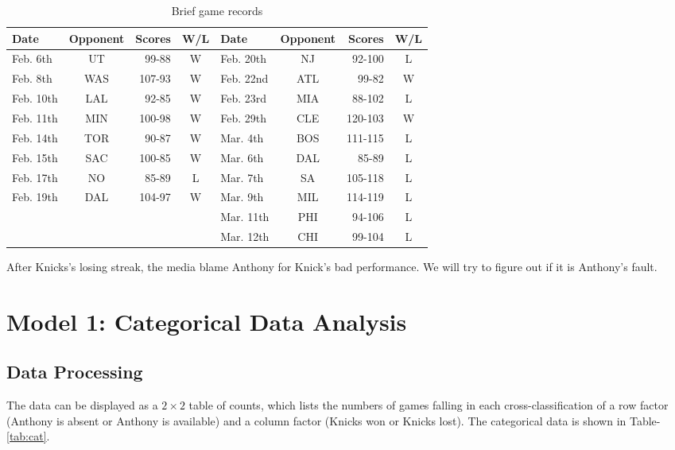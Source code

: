 \documentclass[12pt]{article}
\begin{document}
\begin{table}[ht!]
  \begin{center}
    \begin{tabular}{|l|c|r|c|l|c|r|c|}
      \hline
Date      & Opponent & Scores  & W/L &
Date      & Opponent & Scores  & W/L \\ \hline
Feb. 6th  & UT       & 99-88   & W   &
Feb. 20th & NJ       & 92-100  & L   \\ \hline
Feb. 8th  & WAS      & 107-93  & W   &
Feb. 22nd & ATL      & 99-82   & W   \\ \hline
Feb. 10th & LAL      & 92-85   & W   &
Feb. 23rd & MIA      & 88-102  & L   \\ \hline
Feb. 11th & MIN      & 100-98  & W   &
Feb. 29th & CLE      & 120-103 & W   \\ \hline
Feb. 14th & TOR      & 90-87   & W   &
Mar. 4th  & BOS      & 111-115 & L   \\ \hline
Feb. 15th & SAC      & 100-85  & W   &
Mar. 6th  & DAL      & 85-89   & L   \\ \hline
Feb. 17th & NO       & 85-89   & L   &
Mar. 7th  & SA       & 105-118 & L   \\ \hline
Feb. 19th & DAL      & 104-97  & W   &
Mar. 9th  & MIL      & 114-119 & L   \\ \hline
          &          &         &     &
Mar. 11th & PHI      & 94-106  & L   \\ \hline
          &          &         &     &
Mar. 12th & CHI      & 99-104  & L   \\ \hline
    \end{tabular}
  \end{center}
  \caption{Brief game records \label{tab:data1}}
\end{table}

After Knicks's losing streak, the media blame Anthony for Knick's bad
performance. We will try to figure out if it is Anthony's fault.

\section{Model 1: Categorical Data Analysis}

\subsection{Data Processing}

The data can be displayed as a $2 \times 2$ table of counts, which
lists the numbers of games falling in each cross-classification of a
row factor (Anthony is absent or Anthony is available) and a column
factor (Knicks won or Knicks lost). The categorical data is shown in
Table-\ref{tab:cat}.
\end{document}
